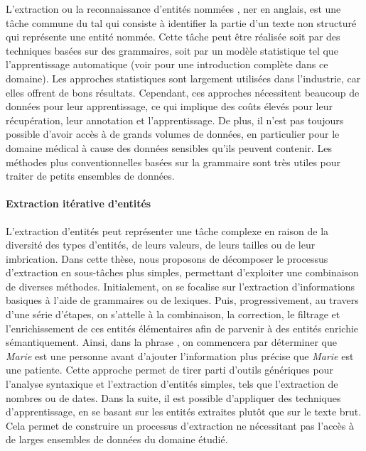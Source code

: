 L'extraction ou la reconnaissance d'entités nommées \cite{patel-schneiderUsingDescriptionLogics2015}, \gls{ner} en anglais, est une tâche commune du \gls{tal} qui consiste à identifier la partie d'un texte non structuré qui représente une entité nommée.
Cette tâche peut être réalisée soit par des techniques basées sur des grammaires, soit par un modèle statistique tel que l'apprentissage automatique (voir \cite{jurafskySpeechLanguageProcessing2009} pour une introduction complète dans ce domaine).
Les approches statistiques sont largement utilisées dans l'industrie, car elles offrent de bons résultats.
Cependant, ces approches nécessitent beaucoup de données pour leur apprentissage, ce qui implique des coûts élevés pour leur récupération, leur annotation et l'apprentissage.
De plus, il n'est pas toujours possible d'avoir accès à de grands volumes de données, en particulier pour le domaine médical à cause des données sensibles qu'ils peuvent contenir.
Les méthodes plus conventionnelles basées sur la grammaire sont très utiles pour traiter de petits ensembles de données.

\paragraph{Extraction itérative d'entités}
L'extraction d'entités peut représenter une tâche complexe en raison de la diversité des types d'entités, de leurs valeurs, de leurs tailles ou de leur imbrication.
Dans cette thèse, nous proposons de décomposer le processus d'extraction en sous-tâches plus simples, permettant d'exploiter une combinaison de diverses méthodes.
Initialement, on se focalise sur l'extraction d'informations basiques à l'aide de grammaires ou de lexiques.
Puis, progressivement, au travers d'une série d'étapes, on s'attelle à la combinaison, la correction, le filtrage et l'enrichissement de ces entités élémentaires afin de parvenir à des entités enrichie sémantiquement.
Ainsi, dans la phrase , on commencera par déterminer que \emph{Marie} est une personne avant d'ajouter l'information plus précise que \emph{Marie} est une patiente.
Cette approche permet de tirer parti d'outils génériques pour l'analyse syntaxique et l'extraction d'entités simples, tels que l'extraction de nombres ou de dates.
Dans la suite, il est possible d'appliquer des techniques d'apprentissage, en se basant sur les entités extraites plutôt que sur le texte brut.
Cela permet de construire un processus d'extraction ne nécessitant pas l'accès à de larges ensembles de données du domaine étudié.

